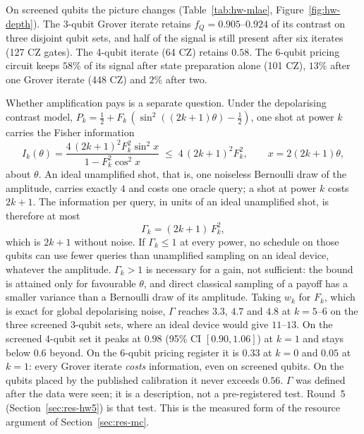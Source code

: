 \documentclass[11pt,a4paper]{article}
\begin{document}
On screened qubits the picture changes
(Table~\ref{tab:hw-mlae}, Figure~\ref{fig:hw-depth}). The 3-qubit Grover
iterate retains $f_Q = 0.905$--$0.924$ of its contrast on three disjoint
qubit sets, and half of the signal is still present after six iterates (127
CZ gates). The 4-qubit iterate (64 CZ) retains $0.58$. The 6-qubit pricing
circuit keeps $58\%$ of its signal after state preparation alone (101 CZ),
$13\%$ after one Grover iterate (448 CZ) and $2\%$ after two.

Whether amplification pays is a separate question. Under the depolarising
contrast model, $P_k = \tfrac12 + F_k\,(\sin^2((2k+1)\theta) - \tfrac12)$,
one shot at power $k$ carries the Fisher information
\begin{equation}
I_k(\theta) = \frac{4\,(2k+1)^2 F_k^2 \sin^2 x}{1 - F_k^2\cos^2 x}
\;\le\; 4\,(2k+1)^2 F_k^2, \qquad x = 2(2k+1)\theta ,
\end{equation}
about $\theta$. An ideal unamplified shot, that is, one noiseless Bernoulli
draw of the amplitude, carries exactly $4$ and costs one oracle query; a
shot at power $k$ costs $2k+1$. The information per query, in units of an
ideal unamplified shot, is therefore at most
\begin{equation}
\Gamma_k = (2k+1)\,F_k^2 ,
\end{equation}
which is $2k+1$ without noise. If $\Gamma_k \le 1$ at every power, no
schedule on those qubits can use fewer queries than unamplified sampling on
an ideal device, whatever the amplitude. $\Gamma_k > 1$ is necessary for a
gain, not sufficient: the bound is attained only for favourable $\theta$,
and direct classical sampling of a payoff has a smaller variance than a
Bernoulli draw of its amplitude. Taking $w_k$ for $F_k$, which is exact for
global depolarising noise, $\Gamma$ reaches $3.3$, $4.7$ and $4.8$ at
$k = 5$--$6$ on the three screened 3-qubit sets, where an ideal device would
give $11$--$13$. On the screened 4-qubit set it peaks at $0.98$ (95\% CI
$[0.90, 1.06]$) at $k=1$ and stays below $0.6$ beyond. On the 6-qubit
pricing register it is $0.33$ at $k=0$ and $0.05$ at $k=1$: every Grover
iterate \emph{costs} information, even on screened qubits. On the qubits
placed by the published calibration it never exceeds $0.56$. $\Gamma$ was
defined after the data were seen; it is a description, not a pre-registered
test. Round~5 (Section~\ref{sec:res-hw5}) is that test. This is the
measured form of the resource argument of
Section~\ref{sec:res-mc}.
\end{document}
